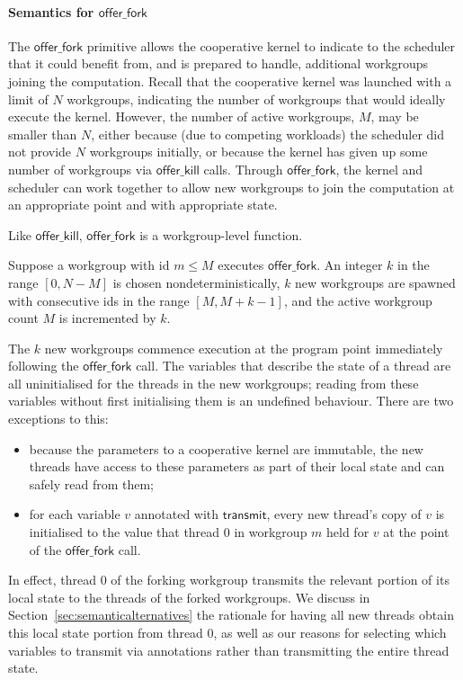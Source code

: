\documentclass[numbers,nocopyrightspace,10pt]{sigplanconf}
\newcommand{\transmit}{\mathsf{transmit}}
\newcommand{\offerfork}{\mathsf{offer\_fork}}
\newcommand{\offerkill}{\mathsf{offer\_kill}}
\begin{document}
\paragraph{Semantics for $\offerfork$}

The $\offerfork$ primitive allows the cooperative kernel to indicate
to the scheduler that it could benefit from, and is prepared to
handle, additional workgroups joining the computation.  Recall that
the cooperative kernel was launched with a limit of $N$ workgroups,
indicating the number of workgroups that would ideally execute the
kernel.  However, the number of active workgroups, $M$, may be smaller
than $N$, either because (due to competing workloads) the scheduler
did not provide $N$ workgroups initially, or because the kernel has
given up some number of workgroups via $\offerkill$ calls.  Through
$\offerfork$, the kernel and scheduler can work together to allow new
workgroups to join the computation at an appropriate point and with
appropriate state.

Like $\offerkill$, $\offerfork$ is a workgroup-level function.

Suppose a workgroup with id $m\leq M$ executes $\offerfork$.  An
integer $k$ in the range $[0, N-M]$ is chosen nondeterministically,
$k$ new workgroups are spawned with consecutive ids in the range $[M,
  M+k-1]$, and the active workgroup count $M$ is incremented by $k$.

The $k$ new workgroups commence execution at the program point
immediately following the $\offerfork$ call.  The variables that
describe the state of a thread are all uninitialised for the threads
in the new workgroups; reading from these variables without first
initialising them is an undefined behaviour.  There are two exceptions
to this:

\begin{itemize}

\item because the parameters to a cooperative kernel are immutable,
  the new threads have access to these parameters as part of their
  local state and can safely read from them;

\item for each variable $v$ annotated with $\transmit$, every new
  thread's copy of $v$ is initialised to the value that thread 0 in
  workgroup $m$ held for $v$ at the point of the $\offerfork$ call.

\end{itemize}

In effect, thread 0 of the forking workgroup transmits the relevant
portion of its local state to the threads of the forked workgroups.
We discuss in Section~\ref{sec:semanticalternatives} the rationale for
having all new threads obtain this local state portion from thread 0,
as well as our reasons for selecting which variables to transmit via
annotations rather than transmitting the entire thread state.
\end{document}
